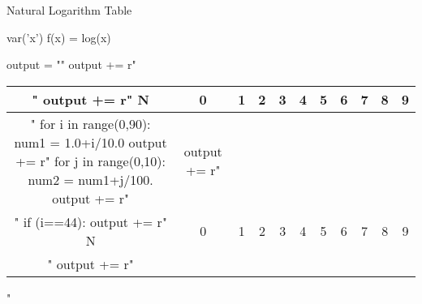 \documentclass[12pt]{article}
\begin{document}
\pagestyle{empty}
\begin{center}
{\LARGE Natural Logarithm Table}
\end{center}
\begin{sagesilent}
var('x')
f(x) = log(x)

output = ""
output += r"\begin{supertabular}{ccccccccccc} "
output += r" N & 0 & 1 & 2 & 3 & 4 & 5 & 6 & 7 & 8 & 9 \\ \hline "
for i in range(0,90):
    num1 = 1.0+i/10.0
    output += r" %
    for j in range(0,10):
        num2 = num1+j/100.
        output += r"& %
    output += r"\\ "
    if (i==44):
        output += r" N & 0 & 1 & 2 & 3 & 4 & 5 & 6 & 7 & 8 & 9 \\ \hline "
output += r"\end{supertabular}"
\end{sagesilent}
\begin{center}
\end{center}
\end{document}
